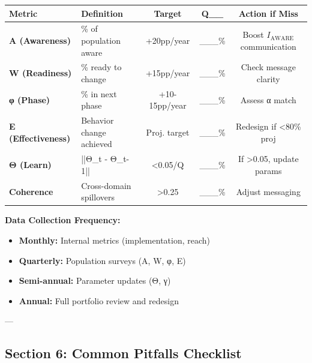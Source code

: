 \begin{center}
\begin{tabular}{@{}llccc@{}}
\toprule
\textbf{Metric} & \textbf{Definition} & \textbf{Target} & \textbf{Q\_\_} & \textbf{Action if Miss} \\
\midrule
\textbf{A (Awareness)} & \% of population aware & +20pp/year & \_\_\_\% & Boost $I_{\text{AWARE}}$ communication \\
\textbf{W (Readiness)} & \% ready to change & +15pp/year & \_\_\_\% & Check message clarity \\
\textbf{φ (Phase)} & \% in next phase & +10-15pp/year & \_\_\_\% & Assess α match \\
\textbf{E (Effectiveness)} & Behavior change achieved & Proj. target & \_\_\_\% & Redesign if <80\% proj \\
\textbf{Θ (Learn)} & ||Θ\_t - Θ\_{t-1}|| & <0.05/Q & \_\_\_\% & If >0.05, update params \\
\textbf{Coherence} & Cross-domain spillovers & >0.25 & \_\_\_\% & Adjust messaging \\
\midrule
\end{tabular}
\end{center}

\textbf{Data Collection Frequency:}
\begin{itemize}[nosep]
\item \textbf{Monthly:} Internal metrics (implementation, reach)
\item \textbf{Quarterly:} Population surveys (A, W, φ, E)
\item \textbf{Semi-annual:} Parameter updates (Θ, γ)
\item \textbf{Annual:} Full portfolio review and redesign
\end{itemize}

---


\subsection*{Section 6: Common Pitfalls Checklist}


